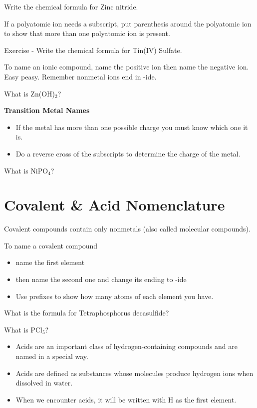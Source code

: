 \documentclass[../hchem.tex]{subfiles}
\begin{document}
\ex Write the chemical formula for Zinc nitride.

If a polyatomic ion needs a subscript, put parenthesis around the polyatomic ion to 
show that more than one polyatomic ion is present.

Exercise - Write the chemical formula for Tin(IV) Sulfate.

To name an ionic compound, name the positive ion then name the negative ion. Easy peasy. Remember nonmetal ions end in -ide.

\ex What is Zn(OH)$_2$? 

\textbf{Transition Metal Names}
\begin{itemize}
    \item If the metal has more than one possible charge you must know which one it is.
    \item Do a reverse cross of the subscripts to determine the charge of the metal.
\end{itemize}

\ex What is NiPO$_4$? 
\section{Covalent \& Acid Nomenclature}
Covalent compounds contain only nonmetals (also called molecular compounds).

To name a covalent compound
\begin{itemize}
    \item name the first element 
    \item then name the second one and change its ending to -ide 
    \item Use prefixes to show how many atoms of each element you have.
\end{itemize}

\ex What is the formula for Tetraphosphorus decasulfide?

\ex What is PCl$_5$?

\begin{itemize}
    \item Acids are an important class of hydrogen-containing compounds and are named in a special way.
    \item Acids are defined as substances whose molecules produce hydrogen ions when dissolved in water.
    \item When we encounter acids, it will be written with H as the first element.
\end{itemize}
\end{document}
